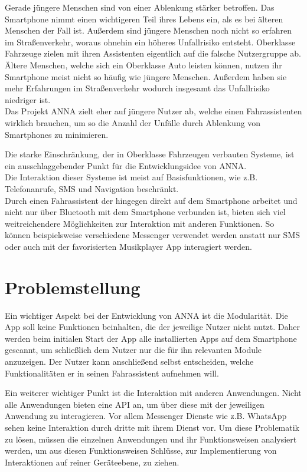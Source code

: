 Gerade jüngere Menschen sind von einer Ablenkung stärker betroffen. Das Smartphone nimmt einen wichtigeren Teil ihres Lebens ein, als es bei älteren Menschen der Fall ist. Außerdem sind jüngere Menschen noch nicht so erfahren im Straßenverkehr, woraus ohnehin ein höheres Unfallrisiko entsteht.
Oberklasse Fahrzeuge zielen mit ihren Assistenten eigentlich auf die falsche Nutzergruppe ab. Ältere Menschen, welche sich ein Oberklasse Auto leisten können, nutzen ihr Smartphone meist nicht so häufig wie jüngere Menschen. Außerdem haben sie mehr Erfahrungen im Straßenverkehr wodurch insgesamt das Unfallrisiko niedriger ist.\\
Das Projekt \ac{ANNA} zielt eher auf jüngere Nutzer ab, welche einen Fahrassistenten wirklich brauchen, um so die Anzahl der Unfälle durch Ablenkung von Smartphones zu minimieren.

Die starke Einschränkung, der in Oberklasse Fahrzeugen verbauten Systeme, ist ein ausschlaggebender Punkt für die Entwicklungsidee von \ac{ANNA}.\\
Die Interaktion dieser Systeme ist meist auf Basisfunktionen, wie z.B. Telefonanrufe, SMS und Navigation beschränkt.\\
Durch einen Fahrassistent der hingegen direkt auf dem Smartphone arbeitet und nicht nur über Bluetooth mit dem Smartphone verbunden ist, bieten sich viel weitreichendere Möglichkeiten zur Interaktion mit anderen Funktionen. So können beispielsweise verschiedene Messenger verwendet werden anstatt nur SMS oder auch mit der favorisierten Musikplayer App interagiert werden.

\section{Problemstellung}
Ein wichtiger Aspekt bei der Entwicklung von \ac{ANNA} ist die Modularität. Die App soll keine Funktionen beinhalten, die der jeweilige Nutzer nicht nutzt. Daher werden beim initialen Start der App alle installierten Apps auf dem Smartphone gescannt, um schließlich dem Nutzer nur die für ihn relevanten Module anzuzeigen. Der Nutzer kann anschließend selbst entscheiden, welche Funktionalitäten er in seinen Fahrassistent aufnehmen will.

Ein weiterer wichtiger Punkt ist die Interaktion mit anderen Anwendungen. Nicht alle Anwendungen bieten eine \ac{API} an, um über diese mit der jeweiligen Anwendung zu interagieren. Vor allem Messenger Dienste wie z.B. WhatsApp sehen keine Interaktion durch dritte mit ihrem Dienst vor. Um diese Problematik zu lösen, müssen die einzelnen Anwendungen und ihr Funktionsweisen analysiert werden, um aus diesen Funktionsweisen Schlüsse, zur Implementierung von Interaktionen auf reiner Geräteebene, zu ziehen.


